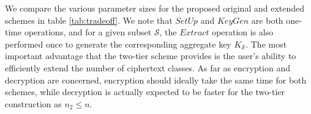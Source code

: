 We compare the various parameter sizes for the proposed original and extended schemes in table \ref{tab:tradeoff}. We note that $SetUp$ and $KeyGen$ are both one-time operations, and for a given subset $\mathcal{S}$, the $Extract$ operation is also performed once to generate the corresponding aggregate key $K_{\mathcal{S}}$. The most important advantage that the two-tier scheme provides is the user's ability to efficiently extend the number of ciphertext classes. As far as encryption and decryption are concerned, encryption should ideally take the same time for both schemes, while decryption is actually expected to be faster for the two-tier construction as $n_2\leq n$.  

\begin{table}[!t]
\captionsetup{font=scriptsize}
\caption{Comparison between the Basic and Two-tier schemes}
\label{tab:tradeoff}
\begin{center}

\end{center}
\end{table}


